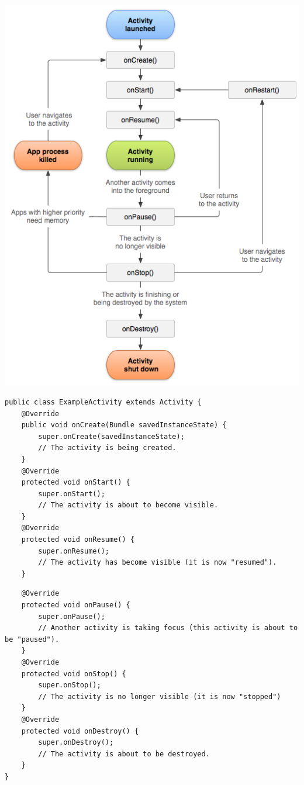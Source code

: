 \documentclass{beamer}
\begin{document}
\begin{frame}
\begin{center}
\includegraphics[scale=0.3]{activity_lifecycle.png}
\end{center}

\end{frame}

\begin{frame}[fragile]
\begin{lstlisting}
public class ExampleActivity extends Activity {
    @Override
    public void onCreate(Bundle savedInstanceState) {
        super.onCreate(savedInstanceState);
        // The activity is being created.
    }
    @Override
    protected void onStart() {
        super.onStart();
        // The activity is about to become visible.
    }
    @Override
    protected void onResume() {
        super.onResume();
        // The activity has become visible (it is now "resumed").
    }
\end{lstlisting}
\end{frame}
\begin{frame}[fragile]
\begin{lstlisting}
    @Override
    protected void onPause() {
        super.onPause();
        // Another activity is taking focus (this activity is about to be "paused").
    }
    @Override
    protected void onStop() {
        super.onStop();
        // The activity is no longer visible (it is now "stopped")
    }
    @Override
    protected void onDestroy() {
        super.onDestroy();
        // The activity is about to be destroyed.
    }
}
\end{lstlisting}

\end{frame}
\end{document}
